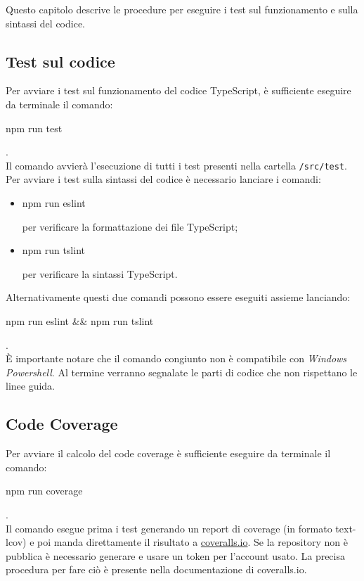 Questo capitolo descrive le procedure per eseguire i test sul funzionamento e sulla sintassi del codice.
\subsection{Test sul codice}
Per avviare i test sul funzionamento del codice TypeScript, è sufficiente eseguire da terminale il comando:
\\[0.2cm]
\hspace*{10mm}
\begin{ttfamily}
	npm run test
\end{ttfamily}.
\\[0.2cm]
Il comando avvierà l'esecuzione di tutti i test presenti nella cartella \texttt{/src/test}.
Per avviare i test sulla sintassi del codice è necessario lanciare i comandi:
\begin{itemize}
	\item \begin{ttfamily}npm run eslint\end{ttfamily} per verificare la formattazione dei file TypeScript;
	\item \begin{ttfamily}npm run tslint\end{ttfamily}
	per verificare la sintassi TypeScript.
\end{itemize}
Alternativamente questi due comandi possono essere eseguiti assieme lanciando:\\[0.2cm]
\hspace*{10mm}
\begin{ttfamily}
npm run eslint \&\& npm run tslint
\end{ttfamily}.
\\[0.2cm]
È importante notare che il comando congiunto non è compatibile con \emph{Windows Powershell}.
Al termine verranno segnalate le parti di codice che non rispettano le linee guida.

\subsection{Code Coverage}
Per avviare il calcolo del code coverage è sufficiente eseguire da terminale il comando:
\\[0.2cm]
\hspace*{10mm}
\begin{ttfamily}
	npm run coverage
\end{ttfamily}.
\\[0.2cm]
Il comando esegue prima i test generando un report di coverage (in formato text-lcov) e poi manda direttamente il risultato a \href{https://coveralls.io/}{coveralls.io}.
Se la repository non è pubblica è necessario generare e usare un token per l'account usato. La precisa procedura per fare ciò è presente nella documentazione di coveralls.io.

\pagebreak